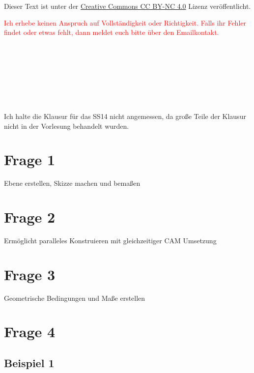 
\usepackage{paralist}


\maketitle

Dieser Text ist unter der
\href{http://creativecommons.org/licenses/by-nc/4.0/}{Creative Commons CC BY-NC 4.0}
Lizenz veröffentlicht.

\textcolor{red}{%
    Ich erhebe keinen Anspruch auf Vollständigkeit oder Richtigkeit. Falls ihr
    Fehler findet oder etwas fehlt, dann meldet euch bitte über den
    Emailkontakt.
}


\hfill\\
\hfill\\
\hfill\\
\hfill\\
\hfill\\
\hfill\\
\hfill\\




Ich halte die Klausur für das SS14 nicht angemessen, da große Teile der Klausur nicht in der Vorlesung behandelt wurden.

\newpage


\section{Frage 1}

Ebene erstellen, Skizze machen und bemaßen


\section{Frage 2}

Ermöglicht paralleles Konstruieren mit gleichzeitiger CAM Umsetzung

\section{Frage 3}

Geometrische Bedingungen und Maße erstellen

\section{Frage 4}

\subsection*{Beispiel 1}

